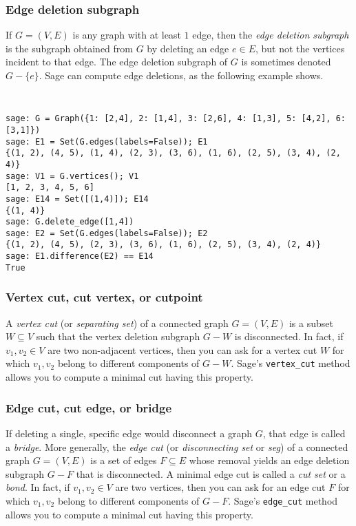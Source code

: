 \subsubsection{Edge deletion subgraph}

If $G = (V,E)$ is any graph with at least $1$ edge, then the
\emph{edge deletion subgraph} is the subgraph obtained from $G$ by
deleting an edge $e \in E$, but not the vertices incident to that edge.
The edge deletion subgraph of $G$ is sometimes denoted $G - \{e\}$.
Sage can compute edge deletions, as the following example shows.
%
\begin{center}
\fontsize{9pt}{9pt}
\selectfont
\tt
\begin{lstlisting}
sage: G = Graph({1: [2,4], 2: [1,4], 3: [2,6], 4: [1,3], 5: [4,2], 6: [3,1]})
sage: E1 = Set(G.edges(labels=False)); E1
{(1, 2), (4, 5), (1, 4), (2, 3), (3, 6), (1, 6), (2, 5), (3, 4), (2, 4)}
sage: V1 = G.vertices(); V1
[1, 2, 3, 4, 5, 6]
sage: E14 = Set([(1,4)]); E14
{(1, 4)}
sage: G.delete_edge([1,4])
sage: E2 = Set(G.edges(labels=False)); E2
{(1, 2), (4, 5), (2, 3), (3, 6), (1, 6), (2, 5), (3, 4), (2, 4)}
sage: E1.difference(E2) == E14
True
\end{lstlisting}
\end{center}


\subsubsection{Vertex cut, cut vertex, or cutpoint}

A \emph{vertex cut} (or \emph{separating set}) of a connected graph
$G = (V, E)$ is a subset $W \subseteq V$ such that the vertex deletion
subgraph $G - W$ is disconnected.
In fact, if $v_1, v_2 \in V$ are two non-adjacent vertices, then you
can ask for a vertex cut $W$ for which $v_1, v_2$ belong to different
components of $G - W$. Sage's \verb!vertex_cut! method allows you to
compute a minimal cut having this property.


\subsubsection{Edge cut, cut edge, or bridge}

If deleting a single, specific edge would disconnect a graph $G$, that
edge is called a \emph{bridge}. More generally, the \emph{edge cut}
(or \emph{disconnecting set} or \emph{seg}) of a connected graph
$G = (V, E)$ is a set of edges $F \subseteq E$ whose removal yields an
edge deletion subgraph $G - F$ that is disconnected. A minimal edge
cut is called a \emph{cut set} or a \emph{bond}.
In fact, if $v_1, v_2 \in V$ are two vertices, then you can ask for an
edge cut $F$ for which $v_1, v_2$ belong to different components of
$G - F$. Sage's \verb!edge_cut! method allows you to compute a minimal
cut having this property.


